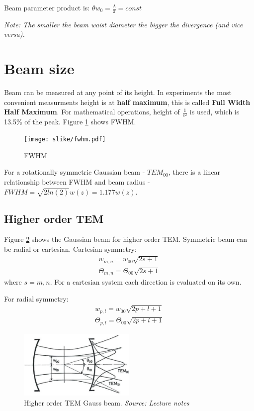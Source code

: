 Beam parameter product is:  $\theta w_0 = \frac{\lambda}{\pi} = const$

\textit{Note: The smaller the beam waist diameter the bigger the divergence (and vice versa).}


\section{Beam size}
Beam can be measured at any point of its height. In experiments the most convenient measurments 
height is at \textbf{half maximum}, this is called \textbf{Full Width Half Maximum}.
For mathematical operations, height of $\frac{1}{e^2}$ is used, which is 13.5\% of the peak.
Figure \ref{fig:beamFWHM} shows FWHM.
\begin{figure}[h!]
    \centering
    \texttt{[image: slike/fwhm.pdf]}
    \caption{FWHM}
    \label{fig:beamFWHM}
\end{figure}

For a rotationally symmetric Gaussian beam - $TEM_{00}$, there is a linear relationship 
between FWHM and beam radius - $FWHM = \sqrt{2 ln(2)}w(z) = 1.177 w(z)$.

\subsection{Higher order TEM}

Figure \ref{fig:hobtem} shows the Gaussian beam for higher order TEM. 
Symmetric beam can be radial or cartesian. 
Cartesian symmetry:
\begin{gather}
    w_{m,n} = w_{00} \sqrt{2s + 1}\\
    \Theta_{m,n} = \Theta_{00} \sqrt{2s + 1}
\end{gather} where $s = m,n$. For a cartesian system each direction is evaluated on its own.

For radial symmetry:
\begin{gather}
    w_{p,l} = w_{00} \sqrt{2p + l + 1} \\
    \Theta_{p,l} = \Theta_{00} \sqrt{2p + l + 1}
\end{gather}

\begin{figure}[h!]
    \centering
    \includegraphics[width=0.5\textwidth]{slike/hobtem.png}
    \caption{Higher order TEM Gauss beam. \textit{Source: Lecture notes} }
    \label{fig:hobtem}
\end{figure}
 
